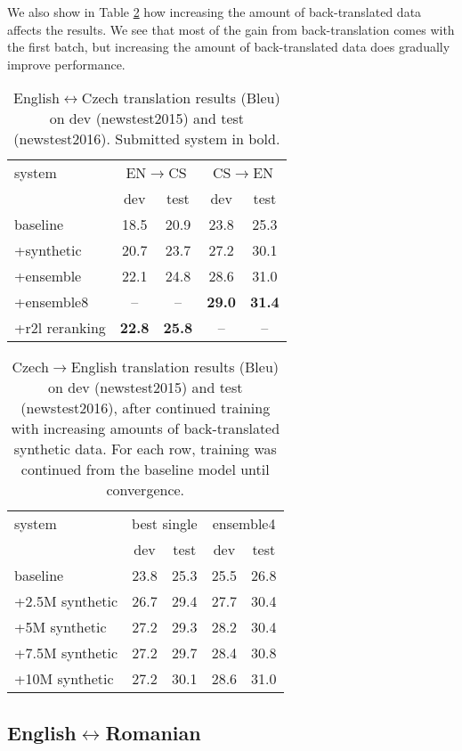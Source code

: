 \documentclass[11pt]{article}
\begin{document}
We also show in Table \ref{increase-bt} how increasing the amount of back-translated data
affects the results. We see that most of the gain from back-translation comes with the first batch, but increasing the amount of back-translated data does
gradually improve performance.

\begin{table}
\centering
\begin{tabular}{l|cc|cc}
system & \multicolumn{2}{c|}{EN$\to$CS} & \multicolumn{2}{c}{CS$\to$EN}\\
& dev & test & dev & test\\
\hline
baseline & 18.5 & 20.9 &   23.8 & 25.3\\ +synthetic & 20.7 & 23.7 &  27.2 & 30.1 \\ +ensemble & 22.1 & 24.8 &  28.6 & 31.0 \\ +ensemble8 & -- & -- & 
\textbf{29.0} & \textbf{31.4} \\ +r2l reranking & \textbf{22.8} & \textbf{25.8} &  -- & -- \\
\end{tabular}
\caption{English$\leftrightarrow$Czech translation results ({\sc Bleu}) on dev (newstest2015) and test (newstest2016). Submitted system in bold.}
\label{results-cs}
\end{table}

\begin{table}
\centering
\begin{tabular}{l|cc|cc}
system & \multicolumn{2}{c|}{best single} & \multicolumn{2}{c}{ensemble4}\\
& dev & test & dev & test\\
\hline
baseline & 23.8 & 25.3 &   25.5 & 26.8 \\  +2.5M synthetic & 26.7 & 29.4 &  27.7 & 30.4 \\ +5M synthetic & 27.2 & 29.3 &  28.2 & 30.4 \\ +7.5M synthetic & 27.2 & 29.7 &  28.4  & 30.8 \\ +10M synthetic & 27.2 & 30.1 &  28.6 & 31.0 \\ \end{tabular}
\caption{Czech$\rightarrow$English translation results ({\sc Bleu}) on dev (newstest2015) and test (newstest2016), after continued training with increasing amounts of 
back-translated synthetic data. For each row, training was continued from the baseline model until convergence.}
\label{increase-bt}
\end{table}

\subsection{English$\leftrightarrow$Romanian}
\end{document}
